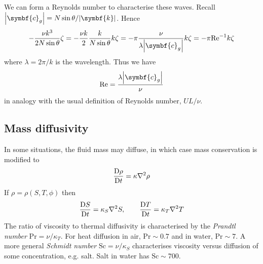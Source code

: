 \documentclass{jknotes}
\begin{document}
\begin{center}
\end{center}
We can form a Reynolds number to characterise these waves. Recall
$\abs{\symbf{c}_g} = N\sin\theta / \abs{\symbf{k}}$. Hence
\begin{equation}
	-\frac{\nu k^3}{2N\sin\theta} \zeta = - \frac{\nu k}{2}
	\frac{k}{N\sin\theta} k \zeta = - \pi \frac{\nu}{\lambda
	\abs{\symbf{c}_g}} k \zeta = - \pi \text{Re}^{-1} k \zeta
\end{equation}
where $\lambda = 2\pi/k$ is the wavelength. Thus we have
\begin{equation}
	\text{Re} = \frac{\lambda \abs{\symbf{c}_g}}{\nu}
\end{equation}
in analogy with the usual definition of Reynolds number, $UL/\nu$.

\subsection{Mass diffusivity}
In some situations, the fluid mass may diffuse, in which case mass
conservation is modified to
\begin{equation}
	\frac{\mathrm{D} \rho}{\mathrm{D} t} = \kappa \nabla^2 \rho
\end{equation}
If $\rho = \rho(S, T, \phi)$ then
\begin{equation}
	\frac{\mathrm{D} S}{\mathrm{D} t} = \kappa_S \nabla^2 S, \hspace{2em} \frac{\mathrm{D}
	T}{\mathrm{D} t} = \kappa_T \nabla^2 T
\end{equation}
The ratio of viscosity to thermal diffusivity is characterised by the
\emph{Prandtl number} $\text{Pr} = \nu/\kappa_T$. For heat diffusion in air,
$\text{Pr} \sim 0.7$ and in water, $\text{Pr} \sim 7$. A more general
\emph{Schmidt number} $\text{Sc} = \nu/\kappa_S$ characterises viscosity
versus diffusion of some concentration, e.g. salt. Salt in water has
$\text{Sc} \sim 700$. 
\end{document}
